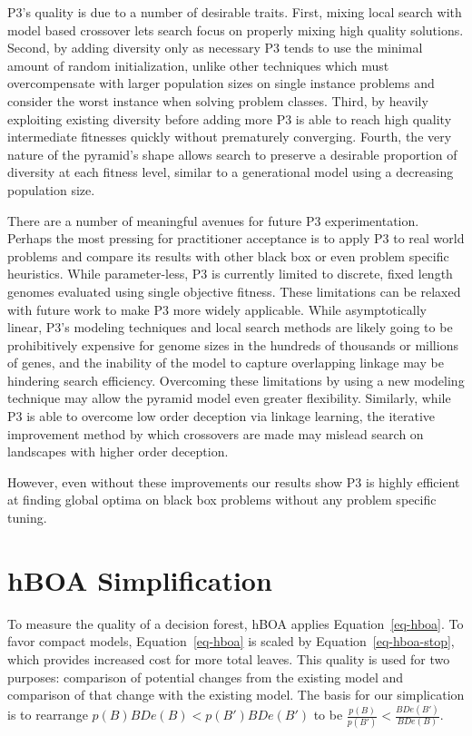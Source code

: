 \documentclass[twoside]{article}
\begin{document}
P3's quality is due to a number of desirable traits. First, mixing local search with model based
crossover lets search focus on properly mixing high quality solutions. Second, by adding diversity only
as necessary P3 tends to use the minimal amount of random initialization, unlike other techniques which must
overcompensate with larger population sizes on single instance problems and consider the worst instance
when solving problem classes. Third, by heavily exploiting existing diversity before adding more P3 is able
to reach high quality intermediate fitnesses quickly without prematurely converging. Fourth, the very
nature of the pyramid's shape allows search to preserve a desirable proportion of diversity at
each fitness level, similar to a generational model using a decreasing population size.

There are a number of meaningful avenues for future P3 experimentation. Perhaps the most
pressing for practitioner acceptance is to apply P3 to real world problems and compare
its results with other black box or even problem specific heuristics. While parameter-less,
P3 is currently limited to discrete, fixed length genomes evaluated using single objective
fitness. These limitations can be relaxed with future work to make P3 more widely applicable.
While asymptotically linear, P3's modeling techniques and local search methods are likely going
to be prohibitively expensive for genome sizes in the hundreds of thousands or millions of genes,
and the inability of the model to capture overlapping linkage may be hindering
search efficiency. Overcoming these limitations by using a new modeling technique may allow
the pyramid model even greater flexibility. Similarly, while P3 is able to overcome low
order deception via linkage learning, the iterative improvement method by which crossovers
are made may mislead search on landscapes with higher order deception.

However, even without
these improvements our results show P3 is highly efficient at finding
global optima on black box problems without any problem specific tuning.

\small




\normalsize
\appendix
\section{hBOA Simplification}
\label{sec-appendix}
To measure the quality of a decision forest, hBOA applies Equation~\ref{eq-hboa}.
To favor compact
models, Equation~\ref{eq-hboa} is scaled by Equation~\ref{eq-hboa-stop}, which provides increased cost
for more total leaves.
This quality is used for two purposes: comparison of potential changes from the existing model
and comparison of that change with the existing model. The basis for our simplication
is to rearrange $p(B)BDe(B) < p(B')BDe(B')$ to be $\frac{p(B)}{p(B')}<\frac{BDe(B')}{BDe(B)}$.
\end{document}
